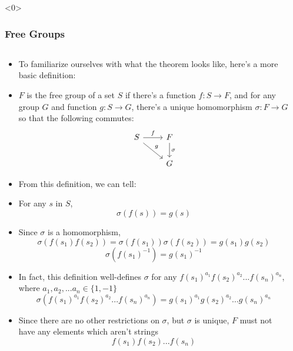 \documentclass[8pt]{beamer}
\begin{document}
  \begin{frame}<0>
    \frametitle{Free Groups}
    \begin{columns}
      \begin{column}[T]{0.5\textwidth}
        \begin{itemize}
          \item To familiarize ourselves with what the theorem looks like,
            here's a more basic definition:
          \item $F$ is the free group of a set $S$ if there's a function
            $f : S \rightarrow F$, and for any group $G$ and function
            $g : S \rightarrow G$, there's a unique homomorphism
            $\sigma : F \rightarrow G$ so that the following commutes:
            \[\begin{tikzcd}[ampersand replacement=\&]
                S \ar[rd, "g"] \ar[r, "f"] \& F \ar[d, "\sigma"]\\
                                                 \& G
              \end{tikzcd}\]
          \item From this definition, we can tell:
          \item For any $s$ in $S$,
            \[\sigma(f(s)) = g(s)\]
          \item Since $\sigma$ is a homomorphism,
            \[\sigma(f(s_1) f(s_2)) = \sigma(f(s_1)) \sigma(f(s_2))
            = g(s_1) g(s_2)\]
            \[\sigma(f(s_1)^{-1}) = g(s_1)^{-1}\]
          \item In fact, this definition well-defines $\sigma$ for any
            $f(s_1)^{a_1} f(s_2)^{a_2} ... f(s_n)^{a_n}$, where
            $a_1, a_2, ... a_n \in \{1,-1\}$
            \[\sigma(f(s_1)^{a_1} f(s_2)^{a_2} ... f(s_n)^{a_n}) =
            g(s_1)^{a_1} g(s_2)^{a_2} ... g(s_n)^{a_n}\]
          \item Since there are no other restrictions on $\sigma$, but $\sigma$
            is unique, $F$ must not have any elements which aren't strings
            \[f(s_1) f(s_2) ... f(s_n)\]
        \end{itemize}
      \end{column}
      \begin{column}[T]{0.5\textwidth}

\end{column}
\end{columns}
\end{frame}
\end{document}
